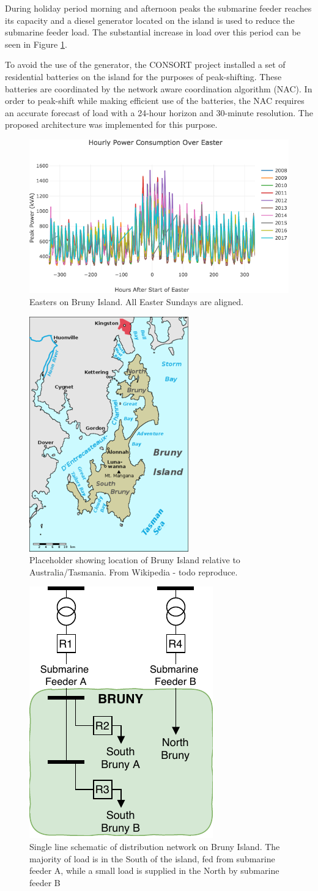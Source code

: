 \documentclass[conference]{IEEEtran}
\begin{document}
During holiday period morning and afternoon peaks the submarine feeder reaches its capacity and a diesel generator located on the island is used to reduce the submarine feeder load.
The substantial increase in load over this period can be seen in Figure \ref{fig:bruny_easter}.

To avoid the use of the generator, the CONSORT project installed a set of residential batteries on the island for the purposes of peak-shifting.
These batteries are coordinated by the network aware coordination algorithm (NAC).
In order to peak-shift while making efficient use of the batteries, the NAC requires an accurate forecast of load with a 24-hour horizon and 30-minute resolution.
The proposed architecture was implemented for this purpose.

\begin{figure}[htbp]
	\centerline{\includegraphics[width=.35\textwidth]{images/easter_bruny.png}}
	\caption{Easters on Bruny Island. All Easter Sundays are aligned.}
	\label{fig:bruny_easter}
\end{figure}

\begin{figure}[htbp]
	\centerline{\includegraphics[width=.35\textwidth]{images/bruny_island_map.png}}
	\caption{Placeholder showing location of Bruny Island relative to Australia/Tasmania. From Wikipedia - todo reproduce.}
	\label{fig:bruny_map}
\end{figure}

\begin{figure}[htbp]
	\centerline{\includegraphics[width=.2\textwidth]{images/bruny_single_line.pdf}}
	\caption{Single line schematic of distribution network on Bruny Island.
			 The majority of load is in the South of the island, fed from submarine feeder A, while a small load is supplied in the North by submarine feeder B}
	\label{fig:bruny_network}
\end{figure}
\end{document}

